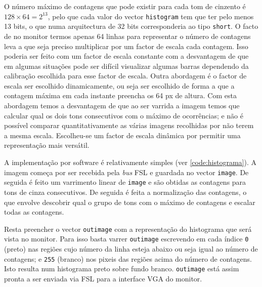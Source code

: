 \documentclass[a4paper,12pt]{article}
\begin{document}


O número máximo de contagens que pode existir para cada tom de cinzento é $128\times64 = 2^{13}$, pelo que cada valor do vector \texttt{histogram} tem que ter pelo menos 13 bits, o que numa arquitectura de 32 bits corresponderia ao tipo \texttt{short}. O facto de no monitor termos apenas 64 linhas para representar o número de contagens leva a que seja preciso multiplicar por um factor de escala cada contagem. Isso poderia ser feito com um factor de escala constante com a desvantagem de que em algumas situações pode ser difícil visualizar algumas barras dependendo da calibração escolhida para esse factor de escala. Outra abordagem é o factor de escala ser escolhido dinamicamente, ou seja ser escolhido de forma a que a contagem máxima em cada instante preencha os 64 px de altura. Com esta abordagem temos a desvantagem de que ao ser varrida a imagem temos que calcular qual os dois tons consecutivos com o máximo de ocorrências; e não é possível comparar quantitativamente as várias imagens recolhidas por não terem a mesma escala. Escolheu-se um factor de escala dinâmica por permitir uma representação mais versátil.

A implementação por software é relativamente simples (ver \autoref{code:histograma}). A imagem começa por ser recebida pela \textit{bus} FSL e guardada no vector \texttt{image}. De seguida é feito um varrimento linear de \texttt{image} e são obtidas as contagens para tons de cinza consecutivos. De seguida é feita a normalização das contagens, o que envolve descobrir qual o grupo de tons com o máximo de contagens e escalar todas as contagens.

Resta preencher o vector \texttt{outimage} com a representação do histograma que será vista no monitor. Para isso basta varrer \texttt{outimage} escrevendo em cada índice \texttt{0} (preto) nas regiões cujo número da linha esteja abaixo ou seja igual ao número de contagens; e \texttt{255} (branco) nos pixeis das regiões acima do número de contagens. Isto resulta num histograma preto sobre fundo branco. \texttt{outimage} está assim pronta a ser enviada via FSL para a interface VGA do monitor.
\end{document}
